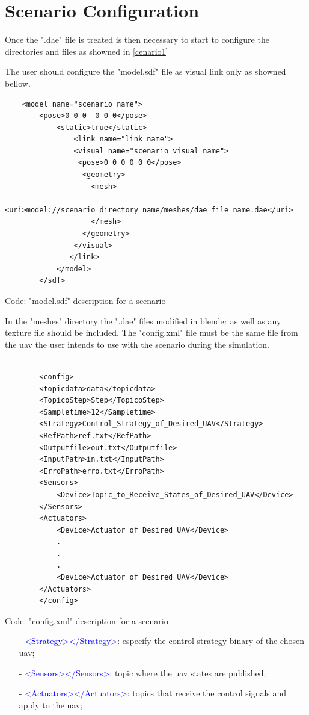 		
		
		\section{Scenario Configuration}
		
		Once the ".dae" file is treated is then necessary to start to configure the directories and files as showned in \ref{cenario1}

		
	The user should configure the "model.sdf" file as visual link only as showned bellow.			

			
			\begin{verbatim}
	<model name="scenario_name">
		<pose>0 0 0  0 0 0</pose>
			<static>true</static>
				<link name="link_name">
				<visual name="scenario_visual_name">
				 <pose>0 0 0 0 0 0</pose>
				  <geometry>
					<mesh>
			<uri>model://scenario_directory_name/meshes/dae_file_name.dae</uri>
					</mesh>
				  </geometry>
				</visual>
			   </link>
			</model>
		</sdf>
		\end{verbatim}
		\centerline{Code: "model.sdf" description for a scenario}	
			
	    In the "meshes" directory the ".dae" files modified in blender as well as any texture file should be included. The "config.xml" file must be the same file from the uav the user intends to use with the scenario during the simulation.
		
		\begin{verbatim}
	
		<config>
	    <topicdata>data</topicdata>
		<TopicoStep>Step</TopicoStep>
		<Sampletime>12</Sampletime>
		<Strategy>Control_Strategy_of_Desired_UAV</Strategy>
		<RefPath>ref.txt</RefPath>
		<Outputfile>out.txt</Outputfile>
		<InputPath>in.txt</InputPath>
		<ErroPath>erro.txt</ErroPath>
		<Sensors>
			<Device>Topic_to_Receive_States_of_Desired_UAV</Device>
		</Sensors>
		<Actuators>
			<Device>Actuator_of_Desired_UAV</Device>
			.
			.
			.
			<Device>Actuator_of_Desired_UAV</Device>
		</Actuators>
		</config>
				\end{verbatim}
			\centerline{Code: "config.xml" description for a scenario}	
		
	\begin{itemize}
	\setlength{\itemsep}{1pt}
	\setlength{\parskip}{0pt}
	\setlength{\parsep}{0pt}
	\item[-] \textcolor{blue}{<Strategy></Strategy>}: especify the control strategy binary of the chosen uav;
	\item[-] \textcolor{blue}{<Sensors></Sensors>}: topic where the uav states are published;
	\item[-] \textcolor{blue}{<Actuators></Actuators>}: topics that receive the control signals and apply to the uav;
	\end{itemize} \normalsize
	
